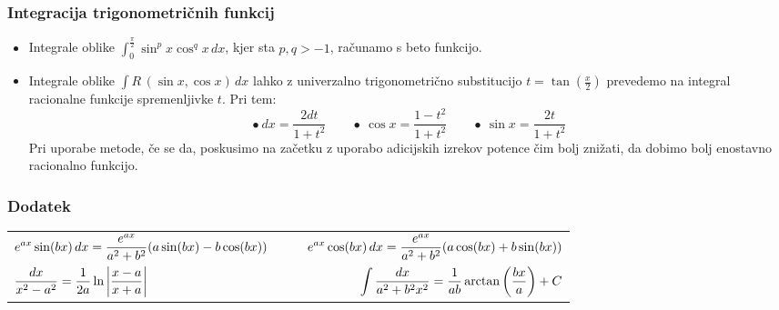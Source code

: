 \subsubsection{Integracija trigonometričnih funkcij}
\begin{itemize}
    \item Integrale oblike $\displaystyle \int_0^\frac{\pi}{2} \sin^px \cos^q x \, dx$, kjer sta $p,q > -1$, računamo s beto funkcijo.
    \item Integrale oblike $\displaystyle \int R \, (\sin x, \cos x) \, dx$ lahko z univerzalno trigonometrično substitucijo $\displaystyle t = \tan \left(\frac{x}{2}\right)$ prevedemo na integral racionalne funkcije spremenljivke $t$. Pri tem:
    $$\bullet \ dx = \frac{2dt}{1+t^2} \qquad \bullet \ \cos x = \frac{1-t^2}{1+t^2} \qquad \bullet \ \sin x = \frac{2t}{1+t^2}$$
    Pri uporabe metode, če se da, poskusimo na začetku z uporabo adicijskih izrekov potence čim bolj znižati, da dobimo bolj enostavno racionalno funkcijo.
\end{itemize}

\subsubsection*{Dodatek}
\begin{center}
    \begin{tabular}{ l r }
     \(\displaystyle e^{ax} \sin (bx) \, dx = \frac{e^{ax}}{a^2+b^2}(a  \sin (bx) - b \cos (bx))\) &
    \(\displaystyle \qquad e^{ax} \cos (bx) \, dx = \frac{e^{ax}}{a^2+b^2}(a  \cos (bx) + b \sin (bx)) \) \\ [2ex]
    \(\displaystyle \frac{dx}{x^2-a^2} = \frac{1}{2a} \ln \left| \frac{x-a}{x+a} \right|\) & \(\displaystyle \int \frac{dx}{a^2+b^2 x^2} = \frac{1}{ab} \arctan \left(\frac{bx}{a}\right) + C\)
    \end{tabular}
\end{center}